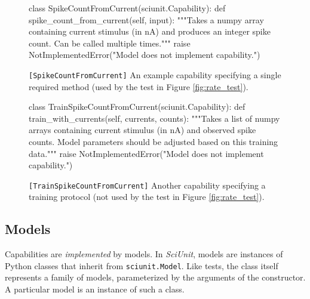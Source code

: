 \documentclass{frontiersSCNS}
\let\verbx\lstinline
\begin{document}
\begin{figure}
\begin{python}
class SpikeCountFromCurrent(sciunit.Capability):
  def spike_count_from_current(self, input): 
    """Takes a numpy array containing current stimulus (in nA) and
    produces an integer spike count. Can be called multiple times."""
    raise NotImplementedError("Model does not implement capability.")
\end{python}
\vspace{-15px}
\caption{\texttt{[SpikeCountFromCurrent]} An example capability specifying a single required method (used by the test in Figure \ref{fig:rate_test}).}
\label{fig:capability}
\vspace{-10px}
\end{figure}
\begin{figure}
\begin{python}
class TrainSpikeCountFromCurrent(sciunit.Capability):
  def train_with_currents(self, currents, counts):
    """Takes a list of numpy arrays containing current stimulus (in nA) and
    observed spike counts. Model parameters should be adjusted based on this
    training data."""
    raise NotImplementedError("Model does not implement capability.")
\end{python}
\vspace{-15px}
\caption{\texttt{[TrainSpikeCountFromCurrent]} Another capability specifying a training protocol (not used by the test in Figure \ref{fig:rate_test}).}
\label{fig:training}
\vspace{-10px}
\end{figure}

\subsection{Models}
Capabilities are \emph{implemented} by models. 
In \textit{SciUnit}, models are instances of Python classes that inherit from \verbx{sciunit.Model}. 
Like tests, the class itself represents a family of models, parameterized by the arguments of the constructor. 
A particular model is an instance of such a class.
\end{document}
